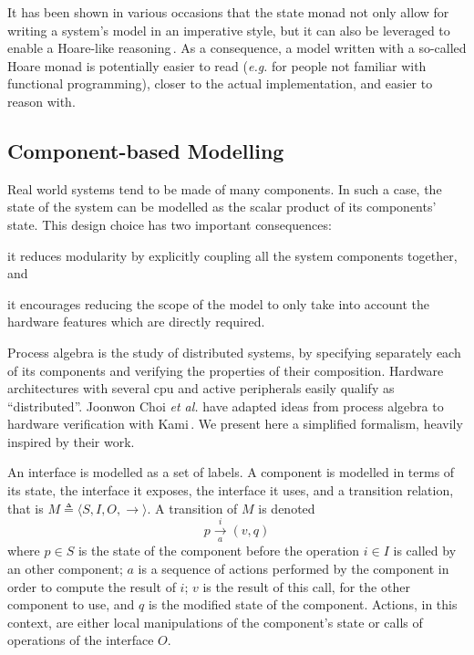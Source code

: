 It has been shown in various occasions that the state monad not only allow for
writing a system's model in an imperative style, but it can also be leveraged to
enable a Hoare-like reasoning\,\cite{chlipala2009ynot,jomaa2016mmu}.
%
As a consequence, a model written with a so-called Hoare monad is potentially
easier to read (\emph{e.g.} for people not familiar with functional
programming), closer to the actual implementation, and easier to reason with.

\subsection{Component-based Modelling}
\label{subsec:related:ease:component}

Real world systems tend to be made of many components.
%
In such a case, the state of the system can be modelled as the scalar product of
its components' state.
%
This design choice has two important consequences:
%
\begin{inparaenum}[(1)]
%
\item it reduces modularity by explicitly coupling all the system components
  together, and
%
\item it encourages reducing the scope of the model to only take into account
  the hardware features which are directly required.
%
\end{inparaenum}

Process algebra is the study of distributed systems, by specifying separately
each of its components and verifying the properties of their composition.
%
Hardware architectures with several \ac{cpu} and active peripherals easily
qualify as ``distributed''.
%
Joonwon Choi \emph{et al.} have adapted ideas from process algebra to hardware
verification with Kami\,\cite{choi2017kami}.
%
We present here a simplified formalism, heavily inspired by their work.

An interface is modelled as a set of labels.
%
A component is modelled in terms of its state, the interface it exposes, the
interface it uses, and a transition relation, that is
$M \triangleq \langle S, I, O, \rightarrow \rangle$.
%
A transition of $M$ is denoted
%
\[ p \xrightarrow[a]{i} (v, q) \]
%
where $p \in S$ is the state of the component before the operation $i \in I$ is
called by an other component;
%
$a$ is a sequence of actions performed by the component in order to compute the
result of $i$;
%
$v$ is the result of this call, for the other component to use, and $q$ is the
modified state of the component.
%
Actions, in this context, are either local manipulations of the component's
state or calls of operations of the interface $O$.

